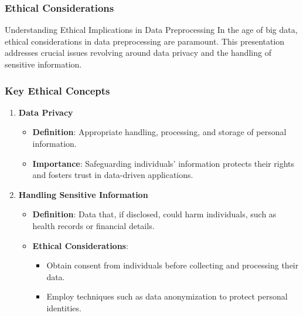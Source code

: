 \documentclass[aspectratio=169]{beamer}
\begin{document}
\begin{frame}[fragile]
    \frametitle{Ethical Considerations}
    \begin{block}{Understanding Ethical Implications in Data Preprocessing}
        In the age of big data, ethical considerations in data preprocessing are paramount. This presentation addresses crucial issues revolving around data privacy and the handling of sensitive information.
    \end{block}
\end{frame}

\begin{frame}[fragile]
    \frametitle{Key Ethical Concepts}
    \begin{enumerate}
        \item \textbf{Data Privacy}
        \begin{itemize}
            \item \textbf{Definition}: Appropriate handling, processing, and storage of personal information.
            \item \textbf{Importance}: Safeguarding individuals' information protects their rights and fosters trust in data-driven applications.
        \end{itemize}
        
        \item \textbf{Handling Sensitive Information}
        \begin{itemize}
            \item \textbf{Definition}: Data that, if disclosed, could harm individuals, such as health records or financial details.
            \item \textbf{Ethical Considerations}:
            \begin{itemize}
                \item Obtain consent from individuals before collecting and processing their data.
                \item Employ techniques such as data anonymization to protect personal identities.
            \end{itemize}
        \end{itemize}
    \end{enumerate}
\end{frame}
\end{document}

